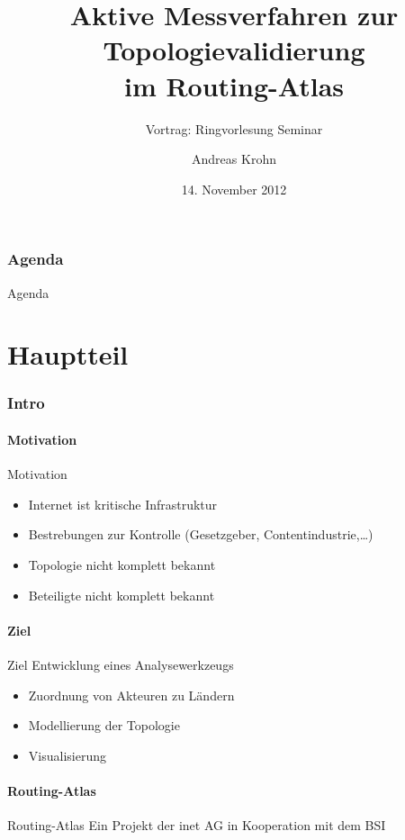 \documentclass[ngerman,compress,hyperref={bookmarks}]{beamer}
\title[Aktive Messverfahren z. Topologievalidierung]{Aktive Messverfahren zur Topologievalidierung\\ im Routing-Atlas}
\subtitle{Vortrag: Ringvorlesung Seminar}
\author{Andreas Krohn}
\institute[HAW]{Hochschule für Angewandte Wissenschaften Hamburg}
\date[WS 2012/13]{14. November 2012}
\begin{document}
\frame[plain]{\titlepage}

\section*{Agenda}
\begin{frame}{Agenda} \setcounter{tocdepth}{1} \tableofcontents[part=1] \setcounter{tocdepth}{3} \end{frame}

\part{Hauptteil}
\section{Intro}
\subsection{Motivation}
\begin{frame}{Motivation}
  \begin{itemize}
    \item Internet ist kritische Infrastruktur
    \item Bestrebungen zur Kontrolle (Gesetzgeber, Contentindustrie,\ldots)
    \item Topologie nicht komplett bekannt
    \item Beteiligte nicht komplett bekannt
  \end{itemize}
\end{frame}

\subsection{Ziel}
\begin{frame}{Ziel}
  Entwicklung eines Analysewerkzeugs %
  \begin{itemize}
    \item Zuordnung von Akteuren zu Ländern
    \item Modellierung der Topologie
    \item Visualisierung
  \end{itemize}
\end{frame}

\subsection{Routing-Atlas}
\begin{frame}{Routing-Atlas}
  Ein Projekt der inet AG in Kooperation mit dem BSI
\end{frame}
\end{document}
